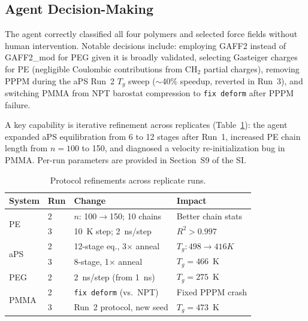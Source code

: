 \documentclass[journal=acsami,manuscript=article]{achemso}
\begin{document}
\subsection{Agent Decision-Making}
\label{sec:agent_decisions}

The agent correctly classified all four polymers and selected force fields without human intervention.
Notable decisions include: employing GAFF2\cite{wang2004gaff} 
instead of GAFF2\_mod\cite{trag2019gaff2mod} for PEG given it is broadly validated, selecting Gasteiger charges for PE (negligible Coulombic contributions from CH$_2$ partial charges), removing PPPM during the aPS Run~2 $T_g$ sweep ($\sim$40\% speedup, reverted in Run~3), and switching PMMA from NPT barostat compression to \texttt{fix deform} after PPPM failure.

A key capability is iterative refinement across replicates (Table~\ref{tab:protocol_evolution}): the agent expanded aPS equilibration from 6 to 12 stages after Run~1, increased PE chain length from $n = 100$ to 150, and diagnosed a velocity re-initialization bug in PMMA.
Per-run parameters are provided in Section~S9 of the SI.

\begin{table}[ht]
\centering
\caption{Protocol refinements across replicate runs.}
\label{tab:protocol_evolution}
\small
\begin{tabular}{@{}llp{3.2cm}l@{}}
\toprule
\textbf{System} & \textbf{Run} & \textbf{Change} & \textbf{Impact} \\
\midrule
\multirow{2}{*}{PE} & 2 & $n$: 100$\to$150; 10 chains & Better chain stats \\
& 3 & 10~K step; 2~ns/step & $R^2 > 0.997$ \\
\midrule
\multirow{2}{*}{aPS} & 2 & 12-stage eq., 3$\times$ anneal & $T_g:498 \to 416K$  \\
& 3 & 8-stage, 1$\times$ anneal & $T_g = 466$~K \\
\midrule
PEG & 2 & 2~ns/step (from 1~ns) & $T_g = 275$~K \\
\midrule
\multirow{2}{*}{PMMA} & 2 & \texttt{fix deform} (vs.\ NPT) & Fixed PPPM crash \\
& 3 & Run~2 protocol, new seed & $T_g = 473$~K \\
\bottomrule
\end{tabular}
\end{table}
\end{document}
